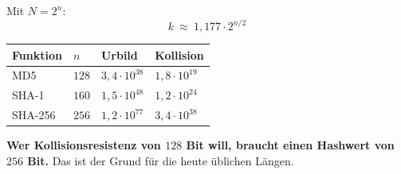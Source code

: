 \begin{merksatz}
Mit $N = 2^{n}$:
\[ k \ \approx\ 1{,}177\cdot2^{n/2} \]

\begin{center}
{\small
\renewcommand{\arraystretch}{1.48}
\begin{tabular}{@{}P{2.0cm}P{1.4cm}P{2.2cm}P{2.4cm}@{}}
\toprule
\textbf{Funktion} & $n$ & \textbf{Urbild} & \textbf{Kollision}\\
\midrule
MD5 & $128$ & $3{,}4\cdot10^{38}$ & $1{,}8\cdot10^{19}$\\
SHA-1 & $160$ & $1{,}5\cdot10^{48}$ & $1{,}2\cdot10^{24}$\\
SHA-256 & $256$ & $1{,}2\cdot10^{77}$ & $3{,}4\cdot10^{38}$\\
\bottomrule
\end{tabular}}
\end{center}

\begin{center}
\begin{minipage}{0.9\textwidth}
\textbf{Wer Kollisionsresistenz von $128$ Bit will, braucht einen Hashwert von $256$ Bit.} Das ist der Grund für die heute üblichen Längen.
\end{minipage}
\end{center}
\end{merksatz}

